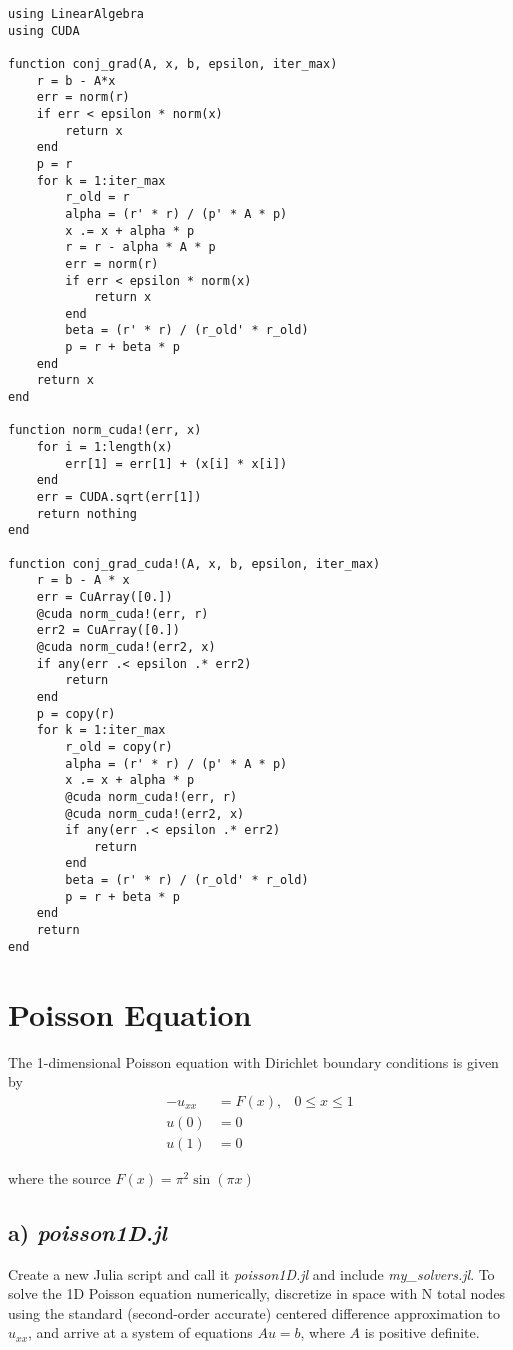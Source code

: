 \documentclass{article}
\begin{document}
\begin{lstlisting}
using LinearAlgebra
using CUDA

function conj_grad(A, x, b, epsilon, iter_max)
    r = b - A*x
    err = norm(r)
    if err < epsilon * norm(x)
        return x
    end
    p = r
    for k = 1:iter_max
        r_old = r
        alpha = (r' * r) / (p' * A * p)
        x .= x + alpha * p
        r = r - alpha * A * p
        err = norm(r) 
        if err < epsilon * norm(x)
            return x
        end
        beta = (r' * r) / (r_old' * r_old)
        p = r + beta * p
    end
    return x
end

function norm_cuda!(err, x)
    for i = 1:length(x)
        err[1] = err[1] + (x[i] * x[i])
    end
    err = CUDA.sqrt(err[1])
    return nothing
end

function conj_grad_cuda!(A, x, b, epsilon, iter_max)
    r = b - A * x
    err = CuArray([0.])
    @cuda norm_cuda!(err, r)
    err2 = CuArray([0.])
    @cuda norm_cuda!(err2, x)
    if any(err .< epsilon .* err2)
        return 
    end
    p = copy(r)
    for k = 1:iter_max
        r_old = copy(r)
        alpha = (r' * r) / (p' * A * p)
        x .= x + alpha * p
        @cuda norm_cuda!(err, r)
        @cuda norm_cuda!(err2, x)
        if any(err .< epsilon .* err2)
            return 
        end
        beta = (r' * r) / (r_old' * r_old)
        p = r + beta * p
    end
    return 
end
\end{lstlisting}

\section{Poisson Equation}
The 1-dimensional Poisson equation with Dirichlet boundary conditions is given
by
\begin{align*}
    -u_{xx} &= F(x), & 0 \leq x \leq 1\\
    u(0) &= 0\\
    u(1) &= 0
\end{align*}

where the source $F(x) = \pi^2 \sin(\pi x)$

\subsection{a) \textit{poisson1D.jl}}

Create a new Julia script and call it \textit{poisson1D.jl} and include
\textit{my\_solvers.jl}. To solve the 1D Poisson equation numerically,
discretize in space with N total nodes using the standard (second-order
accurate) centered difference approximation to $u_{xx}$, and arrive at a system of
equations $Au = b$, where $A$ is positive definite.
\end{document}
